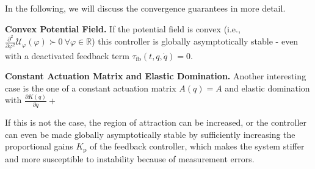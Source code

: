 In the following, we will discuss the convergence guarantees in more detail.

\textbf{Convex Potential Field.} If the potential field is convex (i.e., $\frac{\partial^2}{\partial \varphi^2}  \mathcal{U}_\varphi(\varphi) \succ 0 \: \forall \varphi \in \mathbb{R}$) this controller is globally asymptotically stable - even with a deactivated feedback term $\tau_\mathrm{fb}(t,q,\dot{q})=0$.

\textbf{Constant Actuation Matrix and Elastic Domination.} Another interesting case is the one of a constant actuation matrix $A(q) = A$ and elastic domination with $\frac{\partial K(q)}{\partial q} + $

 If this is not the case, the region of attraction can be increased, or the controller can even be made globally asymptotically stable by sufficiently increasing the proportional gains $K_\mathrm{p}$ of the feedback controller, which makes the system stiffer and more susceptible to instability because of measurement errors.

